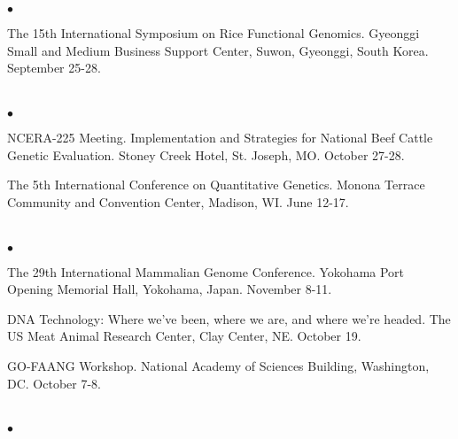 \documentclass[margin,line,10pt]{res}
\newenvironment{list2}{
  \begin{list}{$\bullet$}{%
      \setlength{\itemsep}{0in}
      \setlength{\parsep}{0in} \setlength{\parskip}{0in}
      \setlength{\topsep}{0in} \setlength{\partopsep}{0in} 
      \setlength{\leftmargin}{0.2in}}}{\end{list}}
\begin{document}
\begin{resume}
\begin{list2}
  \vspace{0.5cm}

\item The 15th International Symposium on Rice Functional Genomics. Gyeonggi Small and Medium Business Support Center, Suwon, Gyeonggi, South Korea. September 25-28.

  
  \end{list2}  


\section{}
\begin{list2}

\item NCERA-225 Meeting. Implementation and Strategies for National Beef Cattle Genetic Evaluation. Stoney Creek Hotel, St. Joseph, MO. October 27-28. 

  \vspace{0.5cm}
  
\item The 5th International Conference on Quantitative Genetics. Monona Terrace Community and Convention Center, Madison, WI. June 12-17. 

\end{list2}  




\section{}
\begin{list2}
  
\item The 29th International Mammalian Genome Conference. Yokohama Port Opening Memorial Hall, Yokohama, Japan. November 8-11. 

  \vspace{0.5cm}
  
  \item DNA Technology: Where we've been, where we are, and where we're headed. The US Meat Animal Research Center, Clay Center, NE. October 19. 
  
  \vspace{0.5cm}
  
\item GO-FAANG Workshop. National Academy of Sciences Building, Washington, DC. October 7-8. 
\end{list2}  

\section{}
\begin{list2}


\end{list2}
\end{resume}
\end{document}
